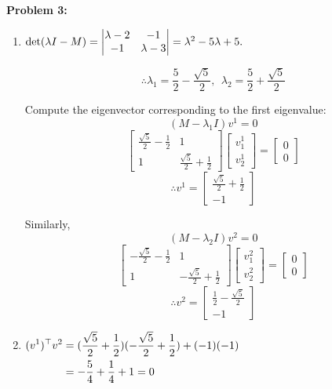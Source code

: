\documentclass[letterpaper]{article}
\begin{document}
\noindent \textbf{Problem 3:}

\begin{enumerate}
\setlength{\itemsep}{.1in}
\renewcommand{\labelenumi}{(\alph{enumi})}

\item $\hfill \text{det}(\lambda I-M)=\begin{vmatrix} \lambda-2 & -1 \\ -1 & \lambda-3 \end{vmatrix}=\lambda^2-5\lambda+5.\hfill$

$$\therefore \lambda_1 = \frac{5}{2}-\frac{\sqrt{5}}{2},~~\lambda_2 = \frac{5}{2}+\frac{\sqrt{5}}{2}$$

Compute the eigenvector corresponding to the first eigenvalue:
$$(M-\lambda_1 I)v^1 = 0$$
$$\left[ \begin{array}{cc} \frac{\sqrt{5}}{2}-\frac{1}{2} & 1 \\ 1 & \frac{\sqrt{5}}{2}+\frac{1}{2} \end{array}\right]\begin{bmatrix}v_1^1 \\ v_2^1\end{bmatrix}=\begin{bmatrix}0\\0\end{bmatrix}$$
$$\therefore v^1=\begin{bmatrix}\frac{\sqrt{5}}{2}+\frac{1}{2} \\ -1\end{bmatrix}$$

Similarly,
$$(M-\lambda_2 I)v^2 = 0$$
$$\left[ \begin{array}{cc} -\frac{\sqrt{5}}{2}-\frac{1}{2} & 1 \\ 1 & -\frac{\sqrt{5}}{2}+\frac{1}{2} \end{array}\right]\begin{bmatrix}v_1^2 \\ v_2^2\end{bmatrix}=\begin{bmatrix}0\\0\end{bmatrix}$$
$$\therefore v^2=\begin{bmatrix}\frac{1}{2}-\frac{\sqrt{5}}{2} \\ -1\end{bmatrix}$$

\item $\hfill \begin{aligned}[t](v^1)^\top v^2 &= (\frac{\sqrt{5}}{2}+\frac{1}{2})(-\frac{\sqrt{5}}{2}+\frac{1}{2})+(-1)(-1) \\  &= -\frac{5}{4}+\frac{1}{4}+1 = 0\end{aligned} \hfill $


\end{enumerate}
\end{document}
